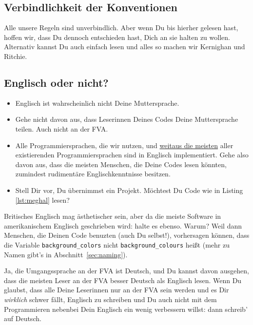 \documentclass[twoside]{scrartcl}
\providecommand{\code}[1]{\texttt{#1}}
\begin{document}
\subsection{Verbindlichkeit der Konventionen\label{sec:zwang}}
Alle unsere Regeln sind unverbindlich. Aber wenn Du bis hierher gelesen hast,
hoffen wir, dass Du dennoch entschieden hast, Dich an sie halten zu wollen.
Alternativ kannst Du auch einfach \cite{KR} lesen und alles so machen wir 
Kernighan und Ritchie.

\subsection{Englisch oder nicht?}
\begin{itemize}
\item Englisch ist wahrscheinlich nicht Deine Muttersprache.
\end{itemize}
\begin{itemize}
\item Gehe nicht davon aus, dass Leserinnen Deines Codes Deine
  Muttersprache teilen. Auch nicht an der FVA.
\item Alle Programmiersprachen, die wir nutzen, und
  \href{http://en.wikipedia.org/wiki/Non-English-based_programming_languages}
  {weitaus die meisten}
  aller existierenden Programmiersprachen sind in Englisch implementiert.
  Gehe also davon aus, dass die meisten Menschen, die Deine Codes lesen
  k\"o{}nnten, zumindest rudiment\"a{}re Englischkenntnisse besitzen.
\item Stell Dir vor, Du \"u{}bernimmst ein Projekt. M\"o{}chtest Du Code wie 
  in Listing \ref{lst:meghal} lesen?
\end{itemize}


 Britisches Englisch mag \"a{}sthetischer sein,
aber da die meiste Software in amerikanischem Englisch geschrieben wird: halte
es ebenso. Warum? Weil dann Menschen, die Deinen Code benuzten 
(auch Du selbst!), vorhersagen k\"o{}nnen, dass die Variable
\code{background\_colors} nicht \code{background\_colours} hei\ss{}t (mehr zu
Namen gibt's in Abschnitt~\ref{sec:naming}). 

 Ja, die Umgangssprache an der FVA ist Deutsch, und Du
kannst davon ausgehen, dass die meisten Leser an der FVA besser Deutsch als
Englisch lesen. Wenn Du glaubst, dass alle Deine Leserinnen nur an der FVA
sein werden und es Dir \emph{wirklich} schwer f\"a{}llt, Englisch zu schreiben
und Du auch nicht mit dem Programmieren nebenbei Dein Englisch ein wenig
verbessern willst: dann schreib' auf Deutsch.
\end{document}
